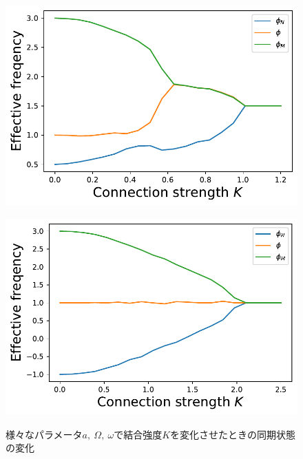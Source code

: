 \documentclass[../main]{subfiles}
\begin{document}
\begin{figure}[tbp]
\begin{minipage}[b]{0.47\linewidth}
      \label{fig:3body-notapprox175}
    \end{minipage}\\
    \begin{minipage}[b]{0.47\linewidth}
        \centering
        \includegraphics[keepaspectratio, scale=0.42]{images/three-body-prob-notapprox-a200.pdf}
      \label{fig:3body-notapprox200}
    \end{minipage}
    \begin{minipage}[b]{0.47\linewidth}
        \centering
        \includegraphics[keepaspectratio, scale=0.42]{images/three-body-prob-symmetry-a100.pdf}
        \label{fig:3body-symmetry}
    \end{minipage}
    \caption{様々なパラメータ$a,\ \Omega,\ \omega$で結合強度$K$を変化させたときの同期状態の変化}
    \label{fig:3body-abs}
\end{figure}
\end{document}

